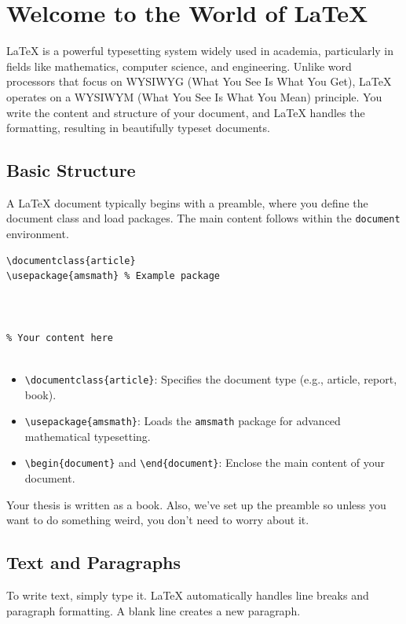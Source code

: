 \section{Welcome to the World of LaTeX}

LaTeX is a powerful typesetting system widely used in academia, particularly in fields like mathematics, computer science, and engineering. Unlike word processors that focus on WYSIWYG (What You See Is What You Get), LaTeX operates on a WYSIWYM (What You See Is What You Mean) principle. You write the content and structure of your document, and LaTeX handles the formatting, resulting in beautifully typeset documents.

\subsection{Basic Structure}

A LaTeX document typically begins with a preamble, where you define the document class and load packages. The main content follows within the \texttt{document} environment.

\begin{verbatim}
\documentclass{article}
\usepackage{amsmath} % Example package



% Your content here


\end{verbatim}

\begin{itemize}
    \item \texttt{\textbackslash documentclass\{article\}}: Specifies the document type (e.g., article, report, book).
    \item \texttt{\textbackslash usepackage\{amsmath\}}: Loads the \texttt{amsmath} package for advanced mathematical typesetting.
    \item \texttt{\textbackslash begin\{document\}} and \texttt{\textbackslash end\{document\}}: Enclose the main content of your document.
\end{itemize}

Your thesis is written as a book. Also, we've set up the preamble so unless you want to do something weird, you don't need to worry about it. 


\subsection{Text and Paragraphs}

To write text, simply type it. LaTeX automatically handles line breaks and paragraph formatting. A blank line creates a new paragraph.

